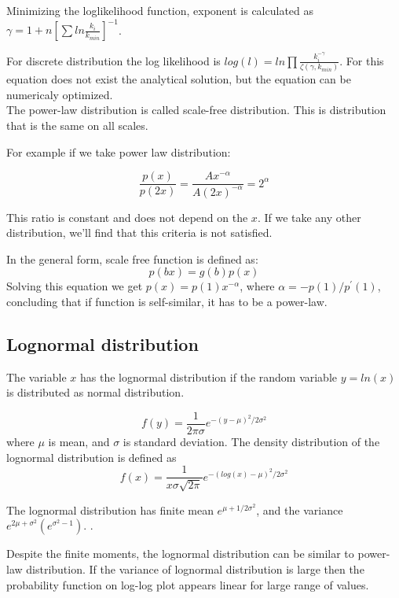 Minimizing the loglikelihood function, exponent is calculated as $\gamma = 1+n[\sum ln \frac{k_i}{k_{min}} ]^{-1}$. 

For discrete distribution the log likelihood is $log(l) = ln\prod \frac{k_i^{-\gamma}}{\zeta(\gamma, k_{min})}$. For this equation does not exist the analytical solution, but the equation can be numericaly optimized. \\

The power-law distribution is called scale-free distribution. This is distribution that is the same on all scales. 

For example if we take power law distribution:

$$\frac{p(x)}{p(2x)} = \frac{Ax^{-\alpha}}{A(2x)^{-\alpha}} = 2^{\alpha}$$ 

This ratio is constant and does not depend on the $x$. If we take any other distribution, we'll find that this criteria is not satisfied. 

In the general form, scale free function is defined as:
$$p(bx) = g(b)p(x)$$ 
Solving this equation we get $p(x)=p(1)x^{-\alpha}$, where $\alpha=-p(1)/p^{'}(1)$, concluding that if function is self-similar, it has to be a power-law. 

\subsection{Lognormal distribution}

The variable $x$ has the lognormal distribution if the random variable $y=ln(x)$ is distributed as normal distribution. 

\begin{equation}
f(y) = \frac{1}{2\pi\sigma}e^{-(y-\mu)^2/2\sigma^2}
\end{equation}
where $\mu$ is mean, and $\sigma$ is standard deviation. The density distribution of the lognormal distribution is defined as
\begin{equation}
f(x) = \frac{1}{x \sigma \sqrt{2\pi}}e^{-(log(x)-\mu)^2 /2\sigma^2} 
\end{equation}

The lognormal distribution has finite mean $e^{\mu+1/2\sigma^2}$, and the variance $e^{2\mu+\sigma^2}(e^{\sigma^2 -1})$.  \cite{mitzenmacher2004brief}.

Despite the finite moments, the lognormal distribution can be similar to power-law distribution. If the variance of lognormal distribution is large then the probability function on log-log plot appears linear for large range of values. 


